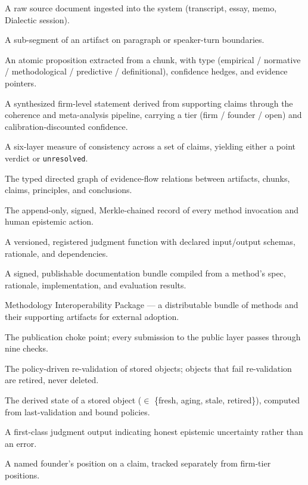 \documentclass[11pt,letterpaper]{article}
\begin{document}
\begin{description}[leftmargin=3.2cm,labelwidth=3cm,labelsep=0.2cm,font=\bfseries]
\item[Artifact] A raw source document ingested into the system (transcript, essay, memo, Dialectic session).
\item[Chunk] A sub-segment of an artifact on paragraph or speaker-turn boundaries.
\item[Claim] An atomic proposition extracted from a chunk, with type (empirical / normative / methodological / predictive / definitional), confidence hedges, and evidence pointers.
\item[Conclusion] A synthesized firm-level statement derived from supporting claims through the coherence and meta-analysis pipeline, carrying a tier (firm / founder / open) and calibration-discounted confidence.
\item[Coherence] A six-layer measure of consistency across a set of claims, yielding either a point verdict or \texttt{unresolved}.
\item[Cascade] The typed directed graph of evidence-flow relations between artifacts, chunks, claims, principles, and conclusions.
\item[Ledger] The append-only, signed, Merkle-chained record of every method invocation and human epistemic action.
\item[Method] A versioned, registered judgment function with declared input/output schemas, rationale, and dependencies.
\item[MethodDoc] A signed, publishable documentation bundle compiled from a method's spec, rationale, implementation, and evaluation results.
\item[MIP] Methodology Interoperability Package --- a distributable bundle of methods and their supporting artifacts for external adoption.
\item[Rigor Gate] The publication choke point; every submission to the public layer passes through nine checks.
\item[Decay] The policy-driven re-validation of stored objects; objects that fail re-validation are retired, never deleted.
\item[Freshness] The derived state of a stored object ($\in$ \{fresh, aging, stale, retired\}), computed from last-validation and bound policies.
\item[Unresolved] A first-class judgment output indicating honest epistemic uncertainty rather than an error.
\item[Voice] A named founder's position on a claim, tracked separately from firm-tier positions.

\end{description}
\end{document}
